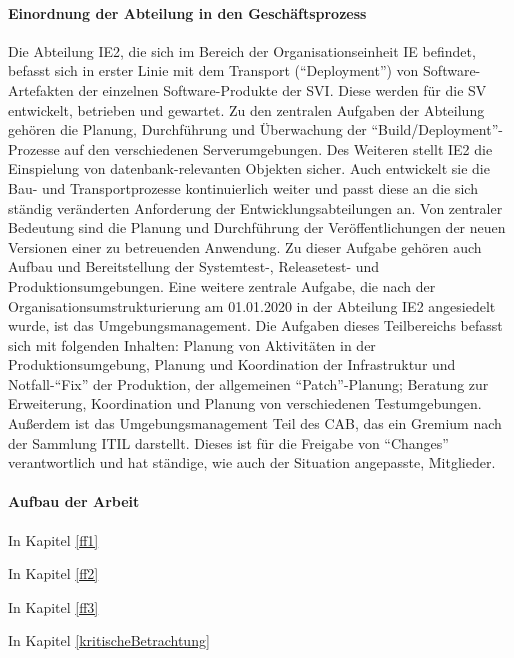 \paragraph{Einordnung der Abteilung in den Geschäftsprozess}
Die Abteilung \ac{IE2}, die sich im Bereich der Organisationseinheit \ac{IE} befindet, befasst sich in erster Linie mit dem Transport (\enquote{Deployment}) von Software-Artefakten der einzelnen Software-Produkte der \ac{SVI}. Diese werden für die \ac{SV} entwickelt, betrieben und gewartet. Zu den zentralen Aufgaben der Abteilung gehören die Planung, Durchführung und Überwachung der \enquote{Build/Deployment}-Prozesse auf den verschiedenen Serverumgebungen. Des Weiteren stellt \ac{IE2} die Einspielung von datenbank-relevanten Objekten sicher. Auch entwickelt sie die Bau- und Transportprozesse kontinuierlich weiter und passt diese an die sich ständig veränderten Anforderung der Entwicklungsabteilungen an. Von zentraler Bedeutung sind die Planung und Durchführung der Veröffentlichungen der neuen Versionen einer zu betreuenden Anwendung. Zu dieser Aufgabe gehören auch Aufbau und Bereitstellung der Systemtest-, Releasetest- und Produktionsumgebungen. Eine weitere zentrale Aufgabe, die nach der Organisationsumstrukturierung am 01.01.2020 in der Abteilung \ac{IE2} angesiedelt wurde, ist das Umgebungsmanagement. Die Aufgaben dieses Teilbereichs befasst sich mit folgenden Inhalten: Planung von Aktivitäten in der Produktionsumgebung, Planung und Koordination der Infrastruktur und Notfall-\enquote{Fix} der Produktion, der allgemeinen \enquote{Patch}-Planung; Beratung zur Erweiterung, Koordination und Planung von verschiedenen Testumgebungen. Außerdem ist das Umgebungsmanagement Teil des \ac{CAB}, das ein Gremium nach der Sammlung \ac{ITIL} darstellt. Dieses ist für die Freigabe von \enquote{Changes} verantwortlich und hat ständige, wie auch der Situation angepasste, Mitglieder. 

\paragraph{Aufbau der Arbeit}
In Kapitel \vref{ff1} \par
In Kapitel \vref{ff2} \par
In Kapitel \vref{ff3} \par
In Kapitel \vref{kritischeBetrachtung}
